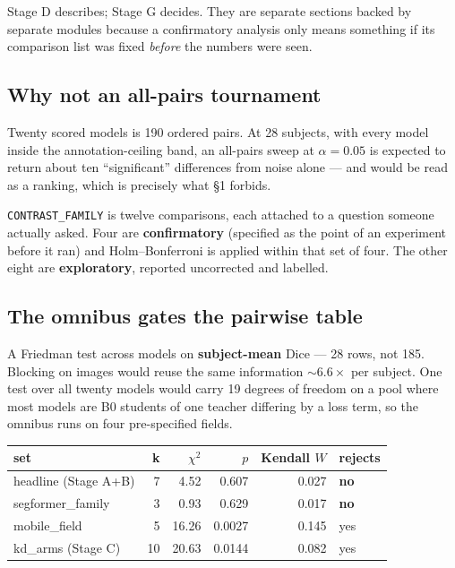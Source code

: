 \documentclass[11pt]{article}
\begin{document}
Stage D describes; Stage G decides. They are separate sections backed by separate
modules because a confirmatory analysis only means something if its comparison
list was fixed \emph{before} the numbers were seen.

\subsection{Why not an all-pairs tournament}

Twenty scored models is 190 ordered pairs. At 28 subjects, with every model inside
the annotation-ceiling band, an all-pairs sweep at $\alpha=0.05$ is expected to
return about ten ``significant'' differences from noise alone --- and would be read
as a ranking, which is precisely what \S1 forbids.

\texttt{CONTRAST\_FAMILY} is twelve comparisons, each attached to a question
someone actually asked. Four are \textbf{confirmatory} (specified as the point of
an experiment before it ran) and Holm--Bonferroni is applied within that set of
four. The other eight are \textbf{exploratory}, reported uncorrected and labelled.

\subsection{The omnibus gates the pairwise table}

A Friedman test across models on \textbf{subject-mean} Dice --- 28 rows, not 185.
Blocking on images would reuse the same information $\sim6.6\times$ per subject.
One test over all twenty models would carry 19 degrees of freedom on a pool where
most models are B0 students of one teacher differing by a loss term, so the
omnibus runs on four pre-specified fields.

\begin{center}
\begin{tabular}{lnnnnl}
\toprule
\textbf{set} & \textbf{k} & \textbf{$\chi^2$} & \textbf{$p$} & \textbf{Kendall $W$} & \textbf{rejects} \\
\midrule
headline (Stage A+B) & 7 & 4.52 & 0.607 & 0.027 & \textbf{no} \\
segformer\_family & 3 & 0.93 & 0.629 & 0.017 & \textbf{no} \\
mobile\_field & 5 & 16.26 & 0.0027 & 0.145 & yes \\
kd\_arms (Stage C) & 10 & 20.63 & 0.0144 & 0.082 & yes \\
\bottomrule
\end{tabular}
\end{center}
\end{document}
